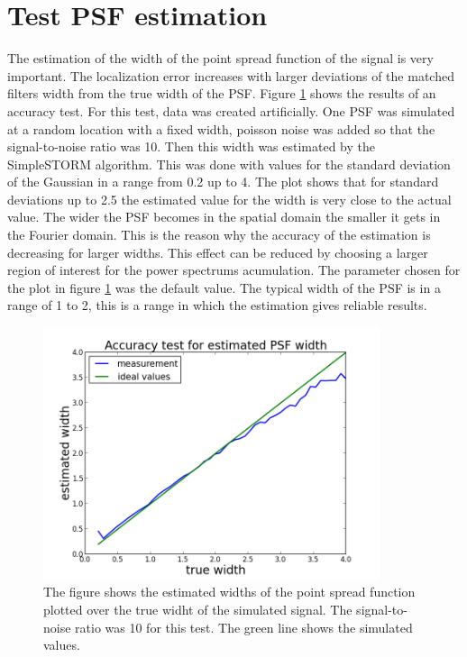 \section{Test PSF estimation}
The estimation of the width of the point spread function of the signal is very important. The localization error increases with larger deviations of the matched filters width from the true width of the PSF. \newline
Figure \ref{estimatedSigma} shows the results of an accuracy test. For this test, data was created artificially. One PSF was simulated at a random location with a fixed width, poisson noise was added so that the signal-to-noise ratio was 10. Then this width was estimated by the SimpleSTORM algorithm. This was done with values for the standard deviation of the Gaussian in a range from 0.2 up to 4. The plot shows that for standard deviations up to 2.5 the estimated value for the width is very close to the actual value. The wider the PSF becomes in the spatial domain the smaller it gets in the Fourier domain. This is the reason why the accuracy of the estimation is decreasing for larger widths. This effect can be reduced by choosing a larger region of interest for the power spectrums acumulation. The parameter chosen for the plot in figure \ref{estimatedSigma} was the default value. The typical width of the PSF is in a range of 1 to 2, this is a range in which the estimation gives reliable results.\newline
\begin{figure}
\centering
\includegraphics[width = 0.88\textwidth]{pictures/AccuracyTestPSFWidth.png}
	 \caption{The figure shows the estimated widths of the point spread function plotted over the true widht of the simulated signal. The signal-to-noise ratio was 10 for this test. The green line shows the simulated values.}
	\label{estimatedSigma}
\end{figure}


